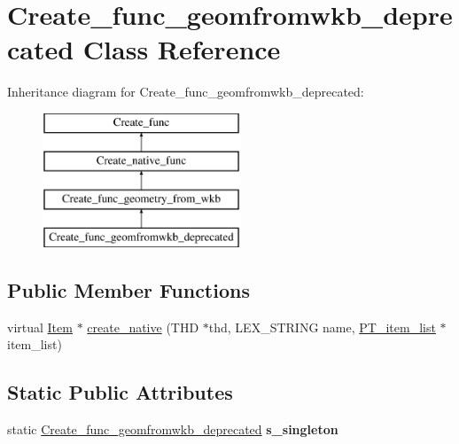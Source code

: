 \hypertarget{classCreate__func__geomfromwkb__deprecated}{}\section{Create\+\_\+func\+\_\+geomfromwkb\+\_\+deprecated Class Reference}
\label{classCreate__func__geomfromwkb__deprecated}
Inheritance diagram for Create\+\_\+func\+\_\+geomfromwkb\+\_\+deprecated\+:\begin{figure}[H]
\begin{center}
\leavevmode
\includegraphics[height=4.000000cm]{classCreate__func__geomfromwkb__deprecated}
\end{center}
\end{figure}
\subsection*{Public Member Functions}
\begin{DoxyCompactItemize}
\item 
virtual \mbox{\hyperlink{classItem}{Item}} $\ast$ \mbox{\hyperlink{classCreate__func__geomfromwkb__deprecated_a3de8d67c5e21d24004f3168fc26c32a4}{create\+\_\+native}} (T\+HD $\ast$thd, L\+E\+X\+\_\+\+S\+T\+R\+I\+NG name, \mbox{\hyperlink{classPT__item__list}{P\+T\+\_\+item\+\_\+list}} $\ast$item\+\_\+list)
\end{DoxyCompactItemize}
\subsection*{Static Public Attributes}
\begin{DoxyCompactItemize}
\item 
\mbox{\label{classCreate__func__geomfromwkb__deprecated_a22dd37a03669f8ed35372c5bbd3d0440}} 
static \mbox{\hyperlink{classCreate__func__geomfromwkb__deprecated}{Create\+\_\+func\+\_\+geomfromwkb\+\_\+deprecated}} {\bfseries s\+\_\+singleton}
\end{DoxyCompactItemize}
